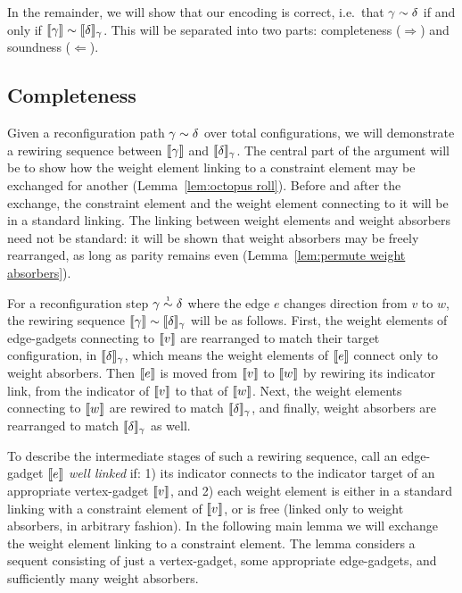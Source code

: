 \documentclass{lmcs}
\begin{document}
In the remainder, we will show that our encoding is correct, i.e.\ that $\gamma\perm\delta$ if and only if $\itn\gamma\perm\itn\delta_\gamma$. This will be separated into two parts: completeness ($\Rightarrow$) and soundness ($\Leftarrow$).






\subsection*{Completeness}



Given a reconfiguration path $\gamma\perm\delta$ over total configurations, we will demonstrate a rewiring sequence between $\llbracket\gamma\rrbracket$ and $\llbracket\delta\rrbracket_\gamma$.
%
The central part of the argument will be to show how the weight element linking to a constraint element may be exchanged for another (Lemma~\ref{lem:octopus roll}).
%
Before and after the exchange, the constraint element and the weight element connecting to it will be in a standard linking.
%
The linking between weight elements and weight absorbers need not be standard: it will be shown that weight absorbers may be freely rearranged, as long as parity remains even (Lemma~\ref{lem:permute weight absorbers}).



For a reconfiguration step $\gamma\perm*\delta$ where the edge $e$ changes direction from $v$ to $w$, the rewiring sequence $\itn\gamma\perm\itn\delta_\gamma$ will be as follows.
%
First, the weight elements of edge-gadgets connecting to $\llbracket v\rrbracket$ are rearranged to match their target configuration, in $\llbracket\delta\rrbracket_\gamma$, which means the weight elements of $\llbracket e\rrbracket$ connect only to weight absorbers.
%
Then $\llbracket e\rrbracket$ is moved from $\llbracket v\rrbracket$ to $\llbracket w\rrbracket$ by rewiring its indicator link, from the indicator of $\llbracket v\rrbracket$ to that of $\llbracket w\rrbracket$.
%
Next, the weight elements connecting to $\llbracket w\rrbracket$ are rewired to match $\llbracket\delta\rrbracket_\gamma$, and finally, weight absorbers are rearranged to match $\llbracket\delta\rrbracket_\gamma$ as well.



To describe the intermediate stages of such a rewiring sequence, call an edge-gadget $\llbracket e\rrbracket$ \emph{well linked} if: 1) its indicator connects to the indicator target of an appropriate vertex-gadget $\llbracket v\rrbracket$, and 2) each weight element is either in a standard linking with a constraint element of $\llbracket v\rrbracket$, or is free (linked only to weight absorbers, in arbitrary fashion). In the following main lemma we will exchange the weight element linking to a constraint element. The lemma considers a sequent consisting of just a vertex-gadget, some appropriate edge-gadgets, and sufficiently many weight absorbers.
\end{document}
